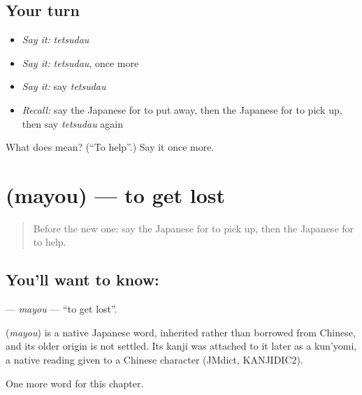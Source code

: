 \subsection*{Your turn}
\begin{itemize}
\raggedright
  \item \emph{Say it:} \emph{tetsudau}
  \item \emph{Say it:} \emph{tetsudau}, once more
  \item \emph{Say it:} say \emph{tetsudau}
  \item \emph{Recall:} say the Japanese for to put away, then the Japanese for to pick up, then say \emph{tetsudau} again
\end{itemize}

\begin{tcolorbox}[breakable,colback=teal!4,colframe=teal!35!black,title={Before you move on}]
What does  mean? (\textquotedblleft{}To help\textquotedblright{}.) Say it once more.
\end{tcolorbox}
\section[\texorpdfstring{\ja{まよう} (mayou)}{まよう (mayou)}]{ (mayou) — to get lost}

\label{lesson:JA-C91-mayou}



\begin{quote}
Before the new one: say the Japanese for to pick up, then the Japanese for to help.
\end{quote}

\subsection*{You'll want to know: }
\textbf{} — \emph{mayou} — \textquotedblleft{}to get lost\textquotedblright{}.

\begin{cousinweb}
\textbf{} (\emph{mayou}) is a native Japanese word, inherited rather than borrowed from Chinese, and its older origin is not settled. Its kanji was attached to it later as a kun'yomi, a native reading given to a Chinese character (JMdict, KANJIDIC2).
\end{cousinweb}

\begin{grammarlens}[title={What you've built}]
One more word for this chapter.
\end{grammarlens}

